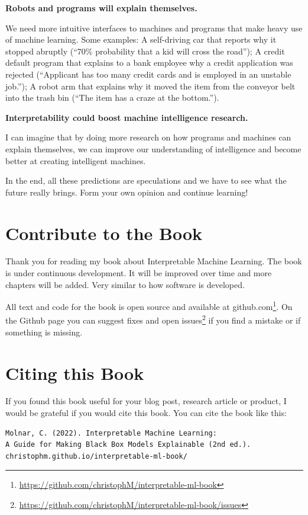 \documentclass[
  10pt,
]{scrbook}
\renewcommand{\href}[2]{#2\footnote{\url{#1}}}
\begin{document}
\textbf{Robots and programs will explain themselves.}

We need more intuitive interfaces to machines and programs that make heavy use of machine learning.
Some examples:
A self-driving car that reports why it stopped abruptly (``70\% probability that a kid will cross the road'');
A credit default program that explains to a bank employee why a credit application was rejected (``Applicant has too many credit cards and is employed in an unstable job.'');
A robot arm that explains why it moved the item from the conveyor belt into the trash bin (``The item has a craze at the bottom.'').

\textbf{Interpretability could boost machine intelligence research.}

I can imagine that by doing more research on how programs and machines can explain themselves, we can improve our understanding of intelligence and become better at creating intelligent machines.

In the end, all these predictions are speculations and we have to see what the future really brings.
Form your own opinion and continue learning!

\hypertarget{contribute}{%
\chapter{Contribute to the Book}\label{contribute}}

Thank you for reading my book about Interpretable Machine Learning.
The book is under continuous development.
It will be improved over time and more chapters will be added.
Very similar to how software is developed.

All text and code for the book is open source and \href{https://github.com/christophM/interpretable-ml-book}{available at github.com}.
On the Github page you can suggest fixes and \href{https://github.com/christophM/interpretable-ml-book/issues}{open issues} if you find a mistake or if something is missing.

\hypertarget{cite}{%
\chapter{Citing this Book}\label{cite}}

If you found this book useful for your blog post, research article or product, I would be grateful if you would cite this book.
You can cite the book like this:

\begin{verbatim}
Molnar, C. (2022). Interpretable Machine Learning:
A Guide for Making Black Box Models Explainable (2nd ed.).
christophm.github.io/interpretable-ml-book/
\end{verbatim}
\end{document}
